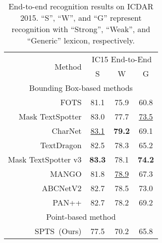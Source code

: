 \documentclass[sigconf]{acmart}
\newcommand{\methodName}{SPTS}
\begin{document}
\begin{table}[t!]
    \centering
    \caption{End-to-end recognition results on ICDAR 2015. “S”, “W”, and “G” represent recognition with “Strong”, “Weak”, and “Generic” lexicon, respectively.}
    \label{ICDAR 2015 End-to-End recognition result}
    \footnotesize
    \begin{tabular}{r|c|c|c}
\hline
    \multirow{2}{*}{Method} & \multicolumn{3}{c}{IC15 End-to-End}                    \\ \cline{2-4} 
                            & \multicolumn{1}{c|}{S}    & \multicolumn{1}{c|}{W}    & G    \\ \hline
    \multicolumn{4}{c}{Bounding Box-based methods} \\ \hline                               
    FOTS \cite{liu2018fots}                    & \multicolumn{1}{c|}{81.1} & \multicolumn{1}{c|}{75.9} & 60.8 \\
    Mask TextSpotter \cite{liao2019mask}        & \multicolumn{1}{c|}{83.0} & \multicolumn{1}{c|}{77.7} & \underline{73.5} \\
    CharNet \cite{xing2019convolutional}                 & \underline{83.1} & \multicolumn{1}{c|}{\textbf{79.2}} & 69.1 \\
    TextDragon \cite{feng2019textdragon} & \multicolumn{1}{c|}{82.5} & \multicolumn{1}{c|}{78.3} & 65.2 \\
    Mask TextSpotter v3 \cite{liao2020masktext} & \multicolumn{1}{c|}{\textbf{83.3}} & \multicolumn{1}{c|}{78.1} & \textbf{74.2} \\
    MANGO \cite{qiao2021mango}                   & \multicolumn{1}{c|}{81.8} & \underline{78.9} & 67.3 \\
    ABCNetV2 \cite{liu2021abcnetv2}                & \multicolumn{1}{c|}{82.7} & \multicolumn{1}{c|}{78.5} & 73.0 \\ 
    PAN++ \cite{wang2021pan++}                   & \multicolumn{1}{c|}{82.7} & \multicolumn{1}{c|}{78.2} & 69.2 \\
    \hline
    \multicolumn{4}{c}{Point-based method} \\ \hline   
    \methodName\ (Ours) &  77.5 & 70.2 & 65.8 \\ \hline
    \end{tabular}
\end{table}
\end{document}

